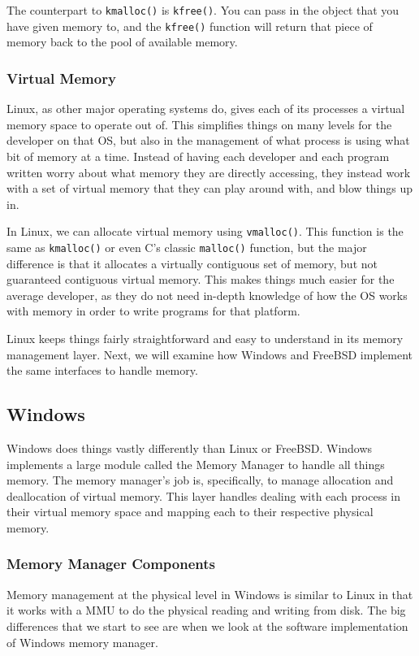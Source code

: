 \documentclass[10pt,letterpaper,onecolumn,draftclsnofoot]{IEEEtran}
\begin{document}
The counterpart to \texttt{kmalloc()} is \texttt{kfree()}. You can pass
in the object that you have given memory to, and the \texttt{kfree()} function
will return that piece of memory back to the pool of available memory.

\subsubsection{Virtual Memory}
Linux, as other major operating systems do, gives each of its processes
a virtual memory space to operate out of. This simplifies things on many
levels for the developer on that OS, but also in the management of what
process is using what bit of memory at a time. Instead of having each
developer and each program written worry about what memory they are 
directly accessing, they instead work with a set of virtual memory that
they can play around with, and blow things up in.

In Linux, we can allocate virtual memory using \texttt{vmalloc()}. This
function is the same as \texttt{kmalloc()} or even C's classic \texttt{malloc()}
function, but the major difference is that it allocates a virtually
contiguous set of memory, but not guaranteed contiguous virtual memory.
This makes things much easier for the average developer, as they do not
need in-depth knowledge of how the OS works with memory in order to write
programs for that platform.

Linux keeps things fairly straightforward and easy to understand in its
memory management layer. Next, we will examine how Windows and FreeBSD
implement the same interfaces to handle	memory.
\subsection{Windows}
Windows does things vastly differently than Linux or FreeBSD. Windows implements
a large module called the Memory Manager to handle all things memory. The memory
manager's job is, specifically, to manage allocation and deallocation of virtual
memory. This layer handles dealing with each process in their virtual memory space
and mapping each to their respective physical memory.
\subsubsection{Memory Manager Components}
Memory management at the physical level in Windows is similar to Linux in that it
works with a MMU to do the physical reading and writing from disk. The big
differences that we start to see are when we look at the software implementation
of Windows memory manager.
\end{document}
